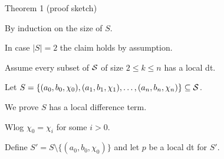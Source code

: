 \documentclass[notes=hide,12pt,xcolor=dvipsnames%
   ]{beamer}
\begin{document}
\begin{frame}[label=local-diff-term-res]{Theorem 1 (proof sketch)}

  By induction on the size of $S$.

  In case $|S| = 2$ the claim holds by assumption.

  Assume every subset of $\mathcal{S}$ of size $2\leq k \leq n$ has a local dt.

  Let $S = \{(a_0, b_0, \chi_0), (a_1, b_1, \chi_1), \dots, (a_{n}, b_{n},\chi_{n})\} \subseteq \mathcal{S}$.
  
  We prove $S$ has a local difference term.

  \pause
  Wlog $\chi_0 = \chi_i$ for some $i>0$.


  Define $S' = S \setminus \{(a_0, b_0, \chi_0)\}$ and let $p$ be a local dt for $S'$.

\end{frame}
\end{document}
